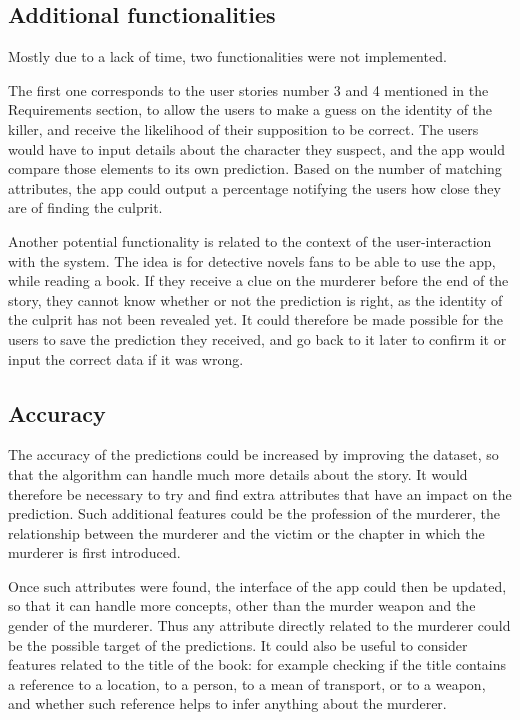\documentclass{mproj}
\begin{document}
\subsection*{Additional functionalities}

\hspace{5mm} Mostly due to a lack of time, two functionalities were not implemented.\par

The first one corresponds to the user stories number 3 and 4 mentioned in the Requirements section, to allow the users to make a guess on the identity of the killer, and receive the likelihood of their supposition to be correct. The users would have to input details about the character they suspect, and the app would compare those elements to its own prediction. Based on the number of matching attributes, the app could output a percentage notifying the users how close they are of finding the culprit. \par

Another potential functionality is related to the context of the user-interaction with the system. The idea is for detective novels fans to be able to use the app, while reading a book. If they receive a clue on the murderer before the end of the story, they cannot know whether or not the prediction is right, as the identity of the culprit has not been revealed yet. It could therefore be made possible for the users to save the prediction they received, and go back to it later to confirm it or input the correct data if it was wrong.

\subsection*{Accuracy}

The accuracy of the predictions could be increased by improving the dataset, so that the algorithm can handle much more details about the story. It would therefore be necessary to try and find extra attributes that have an impact on the prediction. Such additional features could be the profession of the murderer, the relationship between the murderer and the victim or the chapter in which the murderer is first introduced. \par

Once such attributes were found, the interface of the app could then be updated, so that it can handle more concepts, other than the murder weapon and the gender of the murderer. Thus any attribute directly related to the murderer could be the possible target of the predictions.
It could also be useful to consider features related to the title of the book: for example checking if the title contains a reference to a location, to a person, to a mean of transport, or to a weapon, and whether such reference helps to infer anything about the murderer.
	
\end{document}
